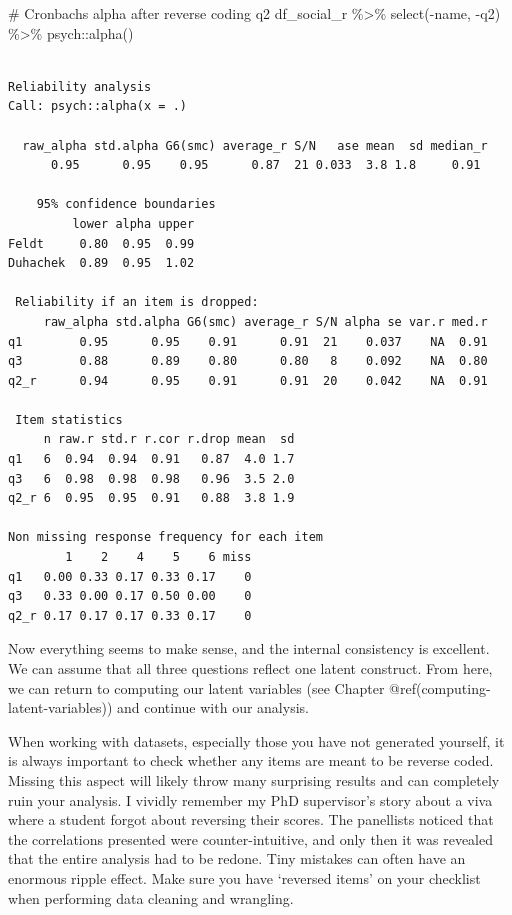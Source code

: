\documentclass[
  letterpaper,
]{krantz}
\makeatletter
\newenvironment{Shaded}{\begin{snugshade}}{\end{snugshade}}
\newcommand{\CommentTok}[1]{\textcolor[rgb]{0.37,0.37,0.37}{#1}}
\newcommand{\FunctionTok}[1]{\textcolor[rgb]{0.28,0.35,0.67}{#1}}
\newcommand{\NormalTok}[1]{\textcolor[rgb]{0.00,0.23,0.31}{#1}}
\newcommand{\SpecialCharTok}[1]{\textcolor[rgb]{0.37,0.37,0.37}{#1}}
\newenvironment{kframe}{%
\medskip{}
\setlength{\fboxsep}{.8em}
 \def\at@end@of@kframe{}%
 \ifinner\ifhmode%
  \def\at@end@of@kframe{\end{minipage}}%
  \begin{minipage}{\columnwidth}%
 \fi\fi%
 \def\FrameCommand##1{\hskip\@totalleftmargin \hskip-\fboxsep
 \colorbox{shadecolor}{##1}\hskip-\fboxsep
     \hskip-\linewidth \hskip-\@totalleftmargin \hskip\columnwidth}%
 \MakeFramed {\advance\hsize-\width
   \@totalleftmargin\z@ \linewidth\hsize
   \@setminipage}}%
 {\par\unskip\endMakeFramed%
 \at@end@of@kframe}
\renewenvironment{Shaded}{\begin{kframe}}{\end{kframe}}
\makeatother
\begin{document}
\begin{Shaded}
\begin{Highlighting}[]
\CommentTok{\# Cronbach\textquotesingle{}s alpha after reverse coding q2}
\NormalTok{df\_social\_r }\SpecialCharTok{\%\textgreater{}\%}
  \FunctionTok{select}\NormalTok{(}\SpecialCharTok{{-}}\NormalTok{name, }\SpecialCharTok{{-}}\NormalTok{q2) }\SpecialCharTok{\%\textgreater{}\%}
\NormalTok{  psych}\SpecialCharTok{::}\FunctionTok{alpha}\NormalTok{()}
\end{Highlighting}
\end{Shaded}

\begin{verbatim}

Reliability analysis   
Call: psych::alpha(x = .)

  raw_alpha std.alpha G6(smc) average_r S/N   ase mean  sd median_r
      0.95      0.95    0.95      0.87  21 0.033  3.8 1.8     0.91

    95% confidence boundaries 
         lower alpha upper
Feldt     0.80  0.95  0.99
Duhachek  0.89  0.95  1.02

 Reliability if an item is dropped:
     raw_alpha std.alpha G6(smc) average_r S/N alpha se var.r med.r
q1        0.95      0.95    0.91      0.91  21    0.037    NA  0.91
q3        0.88      0.89    0.80      0.80   8    0.092    NA  0.80
q2_r      0.94      0.95    0.91      0.91  20    0.042    NA  0.91

 Item statistics 
     n raw.r std.r r.cor r.drop mean  sd
q1   6  0.94  0.94  0.91   0.87  4.0 1.7
q3   6  0.98  0.98  0.98   0.96  3.5 2.0
q2_r 6  0.95  0.95  0.91   0.88  3.8 1.9

Non missing response frequency for each item
        1    2    4    5    6 miss
q1   0.00 0.33 0.17 0.33 0.17    0
q3   0.33 0.00 0.17 0.50 0.00    0
q2_r 0.17 0.17 0.17 0.33 0.17    0
\end{verbatim}

Now everything seems to make sense, and the internal consistency is
excellent. We can assume that all three questions reflect one latent
construct. From here, we can return to computing our latent variables
(see Chapter @ref(computing-latent-variables)) and continue with our
analysis.

When working with datasets, especially those you have not generated
yourself, it is always important to check whether any items are meant to
be reverse coded. Missing this aspect will likely throw many surprising
results and can completely ruin your analysis. I vividly remember my PhD
supervisor's story about a viva where a student forgot about reversing
their scores. The panellists noticed that the correlations presented
were counter-intuitive, and only then it was revealed that the entire
analysis had to be redone. Tiny mistakes can often have an enormous
ripple effect. Make sure you have `reversed items' on your checklist
when performing data cleaning and wrangling.
\end{document}
